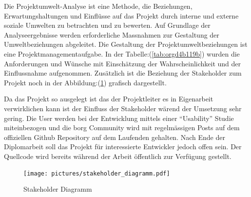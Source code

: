 Die Projektumwelt-Analyse ist eine Methode, die Beziehungen,
Erwartungshaltungen und Einflüsse auf das Projekt durch interne und
externe soziale Umwelten zu betrachten und zu bewerten. Auf Grundlage
der Analyseergebnisse werden erforderliche Massnahmen zur Gestaltung
der Umweltbeziehungen abgeleitet. Die Gestaltung der
Projektumweltbeziehungen ist eine Projektmanagementaufgabe. In der
Tabelle:(\ref{tab:orgd4b119b}) wurden die Anforderungen und Wünsche
mit Einschätzung der Wahrscheinlichkeit und der Einflussnahme aufgenommen.
Zusätzlich ist die Beziehung der Stakeholder zum Projekt noch in der
Abbildung:(\ref{fig:org5fa0b49}) grafisch dargestellt.

Da das Projekt so ausgelegt ist das der Projektleiter es in Eigenarbeit
verwirklichen kann ist der Einfluss der Stakeholder wärend der Umsetzung sehr
gering. Die User werden bei der Entwicklung mittels einer "`Usability"' Studie
miteinbezogen und die \gls{borg} Community wird mit regelmässigen Posts auf dem
offiziellen Github Repository auf dem Laufenden gehalten.
Nach Ende der Diplomarbeit soll das Projekt für interessierte Entwickler jedoch
offen sein. Der Quellcode wird bereits während der Arbeit öffentlich zur
Verfügung gestellt.

\begin{figure}[htbp]
\centering
\texttt{[image: pictures/stakeholder\_diagramm.pdf]}
\caption{\label{fig:org5fa0b49}
Stakeholder Diagramm}
\end{figure}

